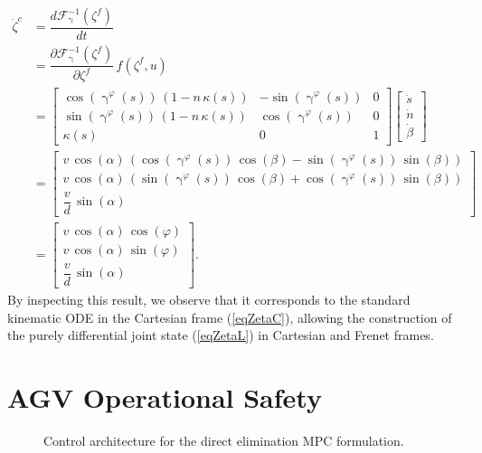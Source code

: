 \begin{subequations}
\begin{align}
    \dot{\zeta}^{c} &= \dfrac{d{\mathcal{F}^{-1}_{\upgamma}(\zeta^{f})}}{dt}\\
    &= \dfrac{\partial{\mathcal{F}^{-1}_{\upgamma}(\zeta^{f})}}{\partial{\zeta}^{f}}\,f(\zeta^{f}, u)\\
    &= \begin{bmatrix}
        \cos(\upgamma^{\varphi}(s))\,(1 - n\,\kappa(s)) &-\sin( \upgamma^{\varphi}(s)) &0\\
        \sin(\upgamma^{\varphi}(s))\,(1 - n\,\kappa(s)) &\cos( \upgamma^{\varphi}(s)) &0\\
        \kappa(s) &0 &1
    \end{bmatrix}
    \begin{bmatrix}
        \dot{s}\\
        \dot{n}\\
        \dot{\beta}
    \end{bmatrix}\\
    &= \begin{bmatrix}
        v\, \cos(\alpha)\, (\cos(\upgamma^{\varphi}(s))\, \cos(\beta) - \sin(\upgamma^{\varphi}(s))\, \sin(\beta))\\
        v\, \cos(\alpha)\, (\sin(\upgamma^{\varphi}(s))\, \cos(\beta) + \cos(\upgamma^{\varphi}(s))\, \sin(\beta))\\
        \dfrac{v}{d}\, \sin(\alpha)      
    \end{bmatrix}\\
    &= \begin{bmatrix}
        v\, \cos(\alpha)\, \cos(\varphi)\\
        v\, \cos(\alpha)\, \sin(\varphi)\\
        \dfrac{v}{d}\, \sin(\alpha)
       \end{bmatrix}.
\end{align}
\end{subequations}
By inspecting this result, we observe that it corresponds to the standard kinematic \ac{ODE} in the Cartesian frame ({\ref{eqZetaC}}), allowing the construction of the purely differential joint state (\ref{eqZetaL}) in Cartesian and Frenet frames.

\section{AGV Operational Safety} \label{appr_oper_safe}
\begin{figure}[tb]
    \begin{center}
        \def\svgwidth{0.95\textwidth}
        
        \caption{Control architecture for the direct elimination MPC formulation.}
        \label{fig_archi}
    \end{center}
\end{figure}

